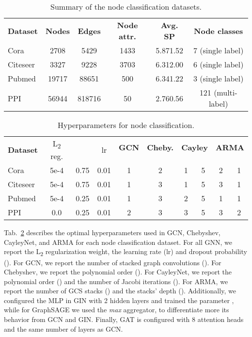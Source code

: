 \documentclass{article}
\begin{document}
\bgroup
\def\arraystretch{1.0} \setlength\tabcolsep{.2em} \begin{table}[!ht]
\small
\centering
\caption{Summary of the node classification datasets.} 
\label{tab:nc_dataset}
\begin{tabular}{lccccc}
\cmidrule[1.5pt]{1-6}
\textbf{Dataset} & \textbf{Nodes} & \textbf{Edges} & \textbf{Node attr.} & \textbf{Avg. SP} & \textbf{Node classes} \\
\cmidrule[.5pt]{1-6}
Cora     & 2708  & 5429   & 1433 & 5.87\tiny{1.52} & 7   (single label) \\
Citeseer & 3327  & 9228   & 3703 & 6.31\tiny{2.00} & 6   (single label) \\
Pubmed   & 19717 & 88651  & 500  & 6.34\tiny{1.22} & 3   (single label) \\
PPI      & 56944 & 818716 & 50   & 2.76\tiny{0.56} & 121 (multi-label)  \\
\cmidrule[1.5pt]{1-6}
\end{tabular}
\end{table}
\egroup



\begin{table}[!ht]
\setlength\tabcolsep{.25em} \small
\centering
\caption{Hyperparameters for node classification.}
\bgroup
\def\arraystretch{1.0} \begin{tabular}{lccc|c|c|cc|cc}
\cmidrule[1.5pt]{1-10}
\multirow{ 2}{*}{\textbf{Dataset}} & \multirow{ 2}{*}{L\textsubscript{2} reg.} & \multirow{ 2}{*}{} & \multirow{ 2}{*}{lr} & \textbf{GCN} & \textbf{Cheby.} & \multicolumn{2}{c|}{\textbf{Cayley}} & \multicolumn{2}{c}{\textbf{ARMA}} \\
& & & &  &  &  &  &  &  \\
\midrule
Cora     & 5e-4 & 0.75 & 0.01 & 1 & 2 & 1 & 5 & 2 & 1  \\
Citeseer & 5e-4 & 0.75 & 0.01 & 1 & 3 & 1 & 5 & 3 & 1  \\
Pubmed   & 5e-4 & 0.25 & 0.01 & 1 & 3 & 2 & 5 & 1 & 1  \\
PPI      & 0.0  & 0.25 & 0.01 & 2 & 3 & 3 & 5 & 3 & 2  \\
\cmidrule[1.5pt]{1-10}
\end{tabular}
\label{tab:hyper_nc}
\egroup
\end{table}


Tab.~\ref{tab:hyper_nc} describes the optimal hyperparameters used in GCN, Chebyshev, CayleyNet, and ARMA for each node classification dataset. 
For all GNN, we report the L\textsubscript{2} regularization weight, the learning rate (lr) and dropout probability (). For GCN, we report the number of stacked graph convolutions (). For Chebyshev, we report the polynomial order (). 
For CayleyNet, we report the polynomial order () and the number of Jacobi iterations ().
For ARMA, we report the number of GCS stacks () and the stacks' depth ().
Additionally, we configured the MLP in GIN with 2 hidden layers and trained the parameter , while for GraphSAGE we used the \textit{max} aggregator, to differentiate more its behavior from GCN and GIN.
Finally, GAT is configured with 8 attention heads and the same number of layers  as GCN.
\end{document}

